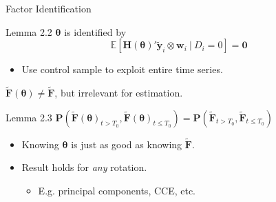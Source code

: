 \documentclass{beamer}
\newcommand{\1}{\mathds{1}} %
\newcommand{\condexpec}[2]{\mathbb{E}\left[#1 \ \vert \ #2\right]}
\begin{document}
\begin{frame}{Factor Identification}
\label{Lemma 2.3 proof back}
    \begin{block}{Lemma 2.2}
        $\bm \theta$ is identified by
        \begin{equation}
            \condexpec{\bm H(\bm \theta)' \tilde{\bm y}_i \otimes \bm w_i }{D_i = 0} = \bm 0
        \end{equation}
    \end{block}
    \begin{itemize}
        \item Use control sample to exploit entire time series. 
    \end{itemize}

    \vspace{.5cm}
    
    $\tilde{\bm F}(\bm \theta) \neq \tilde{\bm F}$, but irrelevant for estimation. 
    \begin{block}{Lemma 2.3}
        $\bm P(\tilde{\bm F}(\bm \theta)_{t > T_0}, \tilde{\bm F}(\bm \theta)_{t \leq T_0}) = \bm P(\tilde{\bm F}_{t > T_0}, \tilde{\bm F}_{t \leq T_0})$
    \end{block}

    \hyperlink{Lemma 2.3 proof}{}
    
    \begin{itemize}
        \item Knowing $\bm \theta$ is just as good as knowing $\tilde{\bm F}$.
        \item Result holds for \emph{any} rotation.
        \begin{itemize}
            \item E.g. principal components, CCE, etc.
        \end{itemize}
    \end{itemize}
\end{frame}

\end{document}
